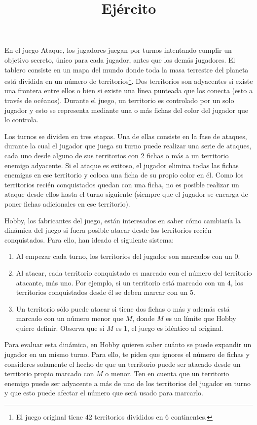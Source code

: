 \documentclass{oci}
\title{Ejército}
\begin{document}
\begin{problemDescription}
  En el juego Ataque, los jugadores juegan por turnos intentando cumplir un
  objetivo secreto, único para cada jugador, antes que los demás jugadores.
  El tablero consiste en un mapa del mundo donde toda la masa terrestre del
  planeta está dividida en un número de territorios\footnote{El juego
  original tiene 42 territorios divididos en 6 continentes.}.
  Dos territorios son adyacentes si existe una frontera entre ellos o bien si
  existe una línea punteada que los conecta (esto a través de océanos).
  Durante el juego, un territorio es controlado por un solo jugador y esto se
  representa mediante una o más fichas del color del jugador que lo controla.

  Los turnos se dividen en tres etapas.
  Una de ellas consiste en la fase de ataques, durante la cual el jugador que
  juega su turno puede realizar una serie de ataques, cada uno desde alguno de
  sus territorios con 2 fichas o más a un territorio enemigo adyacente.
  Si el ataque es exitoso, el jugador elimina todas las fichas enemigas en ese
  territorio y coloca una ficha de su propio color en él.
  Como los territorios recién conquistados quedan con una ficha, no es posible
  realizar un ataque desde ellos hasta el turno siguiente (siempre que el
  jugador se encarga de poner fichas adicionales en ese territorio).

  Hobby, los fabricantes del juego, están interesados en saber cómo cambiaría
  la dinámica del juego si fuera posible atacar desde los territorios recién
  conquistados.
  Para ello, han ideado el siguiente sistema:
  \begin{enumerate}
    \item Al empezar cada turno, los territorios del jugador son marcados con
    un 0.
    \item Al atacar, cada territorio conquistado es marcado con el número del
    territorio atacante, más uno.
    Por ejemplo, si un territorio está marcado con un 4, los territorios
    conquistados desde él se deben marcar con un 5.
    \item Un territorio sólo puede atacar si tiene dos fichas o más y además
    está marcado con un número menor que $M$, donde $M$ es un límite que Hobby
    quiere definir.
    Observa que si $M$ es 1, el juego es idéntico al original.
  \end{enumerate}

  Para evaluar esta dinámica, en Hobby quieren saber cuánto se puede expandir
  un jugador en un mismo turno.
  Para ello, te piden que ignores el número de fichas y consideres solamente el
  hecho de que un territorio puede ser atacado desde un territorio propio
  marcado con $M$ o menor.
  Ten en cuenta que un territorio enemigo puede ser adyacente a más de uno de
  los territorios del jugador en turno y que esto puede afectar el número que
  será usado para marcarlo.
\end{problemDescription}
\end{document}
